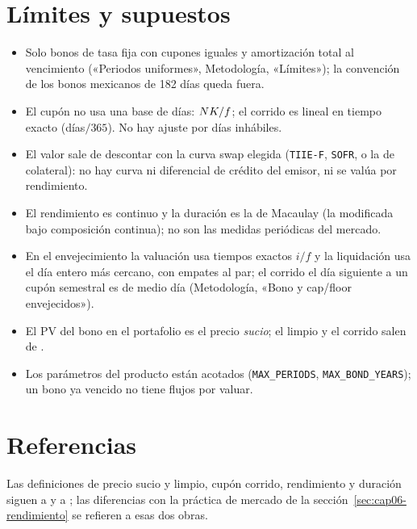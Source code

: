 \section{Límites y supuestos}\label{sec:cap06-limites}

\begin{limites}
  \begin{itemize}
    \item Solo bonos de tasa fija con cupones iguales y amortización total al vencimiento («Periodos
          uniformes», Metodología, «Límites»); la convención de los bonos mexicanos de 182 días queda fuera.
    \item El cupón no usa una base de días: $NK/f$; el corrido es lineal en tiempo exacto (días$/365$). No hay
          ajuste por días inhábiles.
    \item El valor sale de descontar con la curva swap elegida (\texttt{TIIE-F}, \texttt{SOFR}, o la de
          colateral): no hay curva ni diferencial de crédito del emisor, ni se valúa por rendimiento.
    \item El rendimiento es continuo y la duración es la de Macaulay (la modificada bajo composición continua);
          no son las medidas periódicas del mercado.
    \item En el envejecimiento la valuación usa tiempos exactos $i/f$ y la liquidación usa el día entero más
          cercano, con empates al par; el corrido el día siguiente a un cupón semestral es de medio día
          (Metodología, «Bono y cap/floor envejecidos»).
    \item El PV del bono en el portafolio es el precio \emph{sucio}; el limpio y el corrido salen de
          .
    \item Los parámetros del producto están acotados (\texttt{MAX\_PERIODS}, \texttt{MAX\_BOND\_YEARS}); un bono
          ya vencido no tiene flujos por valuar.
  \end{itemize}
\end{limites}

\section{Referencias}\label{sec:cap06-referencias}

Las definiciones de precio sucio y limpio, cupón corrido, rendimiento y duración siguen a
\citet{tuckman2012} y a \citet{hull2018}; las diferencias con la práctica de mercado de la
sección~\ref{sec:cap06-rendimiento} se refieren a esas dos obras.
